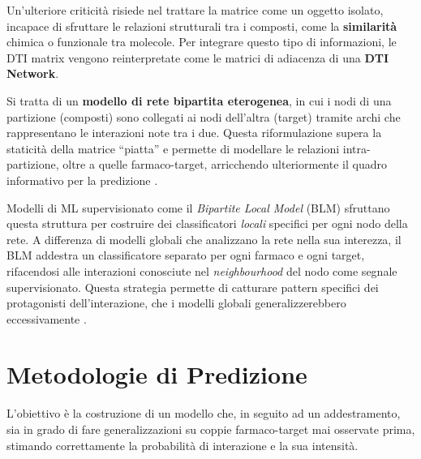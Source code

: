 Un'ulteriore criticità risiede nel trattare la matrice come un oggetto isolato, incapace di sfruttare le relazioni strutturali tra i composti, come la
\textbf{similarità} chimica o funzionale tra molecole.
Per integrare questo tipo di informazioni, le DTI matrix vengono
reinterpretate come le matrici di adiacenza di una \textbf{DTI Network}.

Si tratta di un \textbf{modello di rete bipartita eterogenea}, in cui i
nodi di una partizione (composti) sono collegati ai nodi dell'altra
(target) tramite archi che rappresentano le interazioni note tra i due.
Questa riformulazione supera la staticità della matrice ``piatta'' e
permette di modellare le relazioni intra-partizione, oltre a quelle
farmaco-target, arricchendo ulteriormente il quadro informativo per la
predizione \cite{mondalAIdrivenDrugTarget2026a}.

Modelli di ML supervisionato come il \textit{Bipartite Local Model} (BLM)
sfruttano questa struttura per costruire dei classificatori \textit{locali}
specifici per ogni nodo della rete.
A differenza di modelli globali che analizzano la rete nella sua interezza,
il BLM addestra un classificatore separato per ogni farmaco e ogni target,
rifacendosi alle interazioni conosciute nel \textit{neighbourhood} del nodo come
segnale supervisionato. Questa strategia permette di catturare pattern
specifici dei protagonisti dell'interazione, che i modelli globali
generalizzerebbero eccessivamente \cite{mondalAIdrivenDrugTarget2026a}.

\section{Metodologie di Predizione}
L'obiettivo è la costruzione di un modello che, in seguito ad un
addestramento, sia in grado di fare generalizzazioni su coppie
farmaco-target mai osservate prima, stimando correttamente la probabilità
di interazione e la sua intensità.

